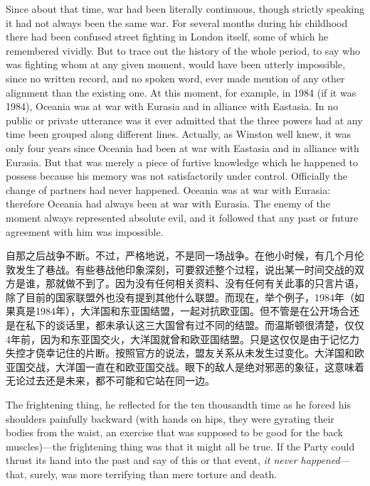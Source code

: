 \begin{paracol}{2}
\switchcolumn*

Since about that time, war had been literally continuous, though
strictly speaking it had not always been the same war. For several
months during his childhood there had been confused street fighting in
London itself, some of which he remembered vividly. But to trace out the
history of the whole period, to say who was fighting whom at any given
moment, would have been utterly impossible, since no written record, and
no spoken word, ever made mention of any other alignment than the
existing one. At this moment, for example, in 1984 (if it was 1984),
Oceania was at war with Eurasia and in alliance with Eastasia. In no
public or private utterance was it ever admitted that the three powers
had at any time been grouped along different lines. Actually, as Winston
well knew, it was only four years since Oceania had been at war with
Eastasia and in alliance with Eurasia. But that was merely a piece of
furtive knowledge which he happened to possess because his memory was
not satisfactorily under control. Officially the change of partners had
never happened. Oceania was at war with Eurasia: therefore Oceania had
always been at war with Eurasia. The enemy of the moment always
represented absolute evil, and it followed that any past or future
agreement with him was impossible.

\switchcolumn

自那之后战争不断。不过，严格地说，不是同一场战争。在他小时候，有几个月伦敦发生了巷战。有些巷战他印象深刻，可要叙述整个过程，说出某一时间交战的双方是谁，那就做不到了。因为没有任何相关资料、没有任何有关此事的只言片语，除了目前的国家联盟外也没有提到其他什么联盟。而现在，举个例子，1984年（如果真是1984年），大洋国和东亚国结盟，一起对抗欧亚国。但不管是在公开场合还是在私下的谈话里，都未承认这三大国曾有过不同的结盟。而温斯顿很清楚，仅仅4年前，因为和东亚国交火，大洋国就曾和欧亚国结盟。只是这仅仅是由于记忆力失控才侥幸记住的片断。按照官方的说法，盟友关系从未发生过变化。大洋国和欧亚国交战，大洋国一直在和欧亚国交战。眼下的敌人是绝对邪恶的象征，这意味着无论过去还是未来，都不可能和它站在同一边。

\switchcolumn*

The frightening thing, he reflected for the ten thousandth time as he
forced his shoulders painfully backward (with hands on hips, they were
gyrating their bodies from the waist, an exercise that was supposed to
be good for the back muscles)---the frightening thing was that it might
all be true. If the Party could thrust its hand into the past and say of
this or that event, \emph{it never happened}---that, surely, was more
terrifying than mere torture and death.


\end{paracol}
